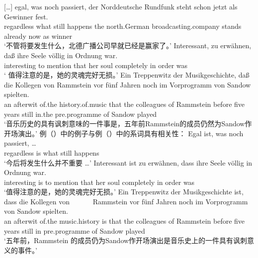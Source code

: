 {}[\ldots]
\gll egal,      was  noch  passiert, der Norddeutsche Rundfunk             steht  schon   jetzt als Gewinner fest.\footnotemark\\
     regardless what still happens the north.German broadcasting.company stands already now as winner \particle\\
\glt `不管将要发生什么，北德广播公司早就已经是赢家了。'
\ex 
\gll Interessant, zu erwähnen, daß ihre Seele völlig    in Ordnung war.\footnotemark\\
	 interesting to mention that her soul completely in order was\\
\glt ` 值得注意的是，她的灵魂完好无损。'
\ex
\gll Ein Treppenwitz der    Musikgeschichte, daß die Kollegen   von Rammstein vor    fünf Jahren noch im      Vorprogramm   von Sandow spielten.\footnotemark\\
	 an afterwit of.the history.of.music that the colleagues of Rammstein before five years still in.the pre.programme of Sandow played\\
\glt `音乐历史的具有讽刺意味的一件事是，五年前Rammstein的成员仍然为Sandow作开场演出。'
\zl
例（）中的例子与例（）中的系词具有相关性：
\eal
\ex 
\gll Egal ist, was noch passiert, \ldots\\
     regardless is	 what still happens \\
\glt `今后将发生什么并不重要 \ldots'
\ex
\gll Interessant ist zu erwähnen, dass ihre Seele völlig in Ordnung war.\\
	 interesting is to mention that her soul completely in order was\\
\glt `值得注意的是，她的灵魂完好无损。'
\ex %
\gll Ein Treppenwitz der Musikgeschichte ist, dass die Kollegen von~~~~~~ Rammstein vor fünf Jahren noch im Vorprogramm von Sandow spielten.\hspace{-5pt}\\
	 an afterwit of.the music.history is that the colleagues of Rammstein before five years still in pre.programme of Sandow played\\
\glt `五年前，Rammstein 的成员仍为Sandow作开场演出是音乐史上的一件具有讽刺意义的事件。'
\zl

